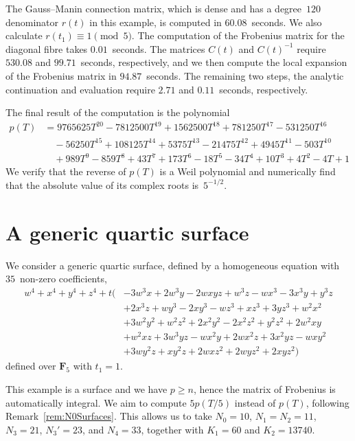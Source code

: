 The Gauss--Manin connection matrix, which is dense and has a degree~$120$ 
denominator $r(t)$ in this example, is computed in $60.08$~seconds.  We 
also calculate $r(t_1) \equiv 1 \pmod{5}$.  The computation of the 
Frobenius matrix for the diagonal fibre takes $0.01$~seconds.  The 
matrices $C(t)$ and $C(t)^{-1}$ require $530.08$ and $99.71$~seconds, 
respectively, and we then compute the local expansion of the Frobenius 
matrix in $94.87$~seconds.  The remaining two steps, the analytic continuation 
and evaluation require $2.71$ and $0.11$~seconds, respectively.

The final result of the computation is the polynomial 
\begin{align*}
p(T) & = 9765625 T^{20}-7812500 T^{19}+1562500 T^{18}+781250 T^{17}-531250 T^{16}\\
     & \quad -56250 T^{15}+108125 T^{14}+5375 T^{13}-21475 T^{12}+4945 T^{11}-503 T^{10}\\
     & \quad +989 T^9-859 T^8+43 T^7+173 T^6-18 T^5-34 T^4+10 T^3+4 T^2-4 T+1
\end{align*}
We verify that the reverse of $p(T)$ is a Weil polynomial and numerically 
find that the absolute value of its complex roots is~$5^{-1/2}$.

\section{A generic quartic surface}
\label{sec:06-GenericQuarticSurface}

We consider a generic quartic surface, defined by a homogeneous equation 
with $35$~non-zero coefficients,
\begin{equation*}
\begin{split}
w^4 + x^4 + y^4 + z^4 
+ t \bigl( & -3 w^3 x + 2 w^3 y - 2 w x y z + w^3 z - w x^3 - 3 x^3 y + y^3 z \\ &
          + 2 x^3 z + w y^3 - 2 x y^3 - w z^3 + x z^3 + 3 y z^3 + w^2 x^2 \\ & 
          + 3 w^2 y^2 + w^2 z^2 + 2 x^2 y^2 - 2 x^2 z^2 + y^2 z^2 
          + 2 w^2 x y \\ & + w^2 x z + 3 w^3 y z - w x^2 y + 2 w x^2 z 
          + 3 x^2 y z - w x y^2 \\ & 
          + 3 w y^2 z + x y^2 z + 2 w x z^2 + 2 w y z^2 + 2 x y z^2 \bigr)
\end{split}
\end{equation*}
defined over $\mathbf{F}_5$ with $t_1 = 1$.

This example is a surface and we have $p \geq n$, hence the matrix of Frobenius 
is automatically integral.  We aim to compute $5 p(T/5)$ instead of $p(T)$, 
following Remark~\ref{rem:N0Surfaces}.  This allows us to take $N_0 = 10$, 
$N_1 = N_2 = 11$, $N_3 = 21$, $N_3' = 23$, and $N_4 = 33$, together with 
$K_1 = 60$ and $K_2 = 13740$.

